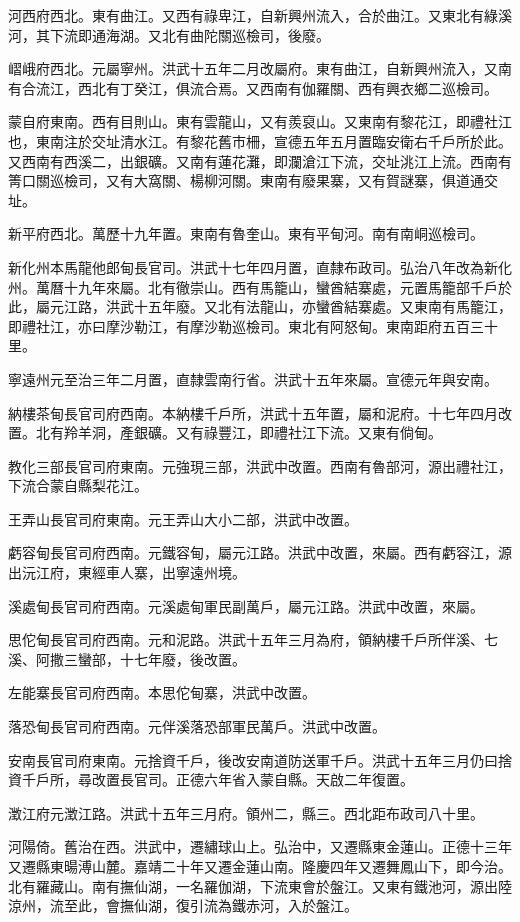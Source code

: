 河西府西北。東有曲江。又西有祿卑江，自新興州流入，合於曲江。又東北有綠溪河，其下流即通海湖。又北有曲陀關巡檢司，後廢。

嶍峨府西北。元屬寧州。洪武十五年二月改屬府。東有曲江，自新興州流入，又南有合流江，西北有丁癸江，俱流合焉。又西南有伽羅關、西有興衣鄉二巡檢司。

蒙自府東南。西有目則山。東有雲龍山，又有羨裒山。又東南有黎花江，即禮社江也，東南注於交址清水江。有黎花舊市柵，宣德五年五月置臨安衛右千戶所於此。又西南有西溪二，出銀礦。又南有蓮花灘，即瀾滄江下流，交址洮江上流。西南有箐口關巡檢司，又有大窩關、楊柳河關。東南有廢果寨，又有賀謎寨，俱道通交址。

新平府西北。萬歷十九年置。東南有魯奎山。東有平甸河。南有南峒巡檢司。

新化州本馬龍他郎甸長官司。洪武十七年四月置，直隸布政司。弘治八年改為新化州。萬曆十九年來屬。北有徹崇山。西有馬籠山，蠻酋結寨處，元置馬籠部千戶於此，屬元江路，洪武十五年廢。又北有法龍山，亦蠻酋結寨處。又東南有馬籠江，即禮社江，亦曰摩沙勒江，有摩沙勒巡檢司。東北有阿怒甸。東南距府五百三十里。

寧遠州元至治三年二月置，直隸雲南行省。洪武十五年來屬。宣德元年與安南。

納樓茶甸長官司府西南。本納樓千戶所，洪武十五年置，屬和泥府。十七年四月改置。北有羚羊洞，產銀礦。又有祿豐江，即禮社江下流。又東有倘甸。

教化三部長官司府東南。元強現三部，洪武中改置。西南有魯部河，源出禮社江，下流合蒙自縣梨花江。

王弄山長官司府東南。元王弄山大小二部，洪武中改置。

虧容甸長官司府西南。元鐵容甸，屬元江路。洪武中改置，來屬。西有虧容江，源出沅江府，東經車人寨，出寧遠州境。

溪處甸長官司府西南。元溪處甸軍民副萬戶，屬元江路。洪武中改置，來屬。

思佗甸長官司府西南。元和泥路。洪武十五年三月為府，領納樓千戶所伴溪、七溪、阿撒三蠻部，十七年廢，後改置。

左能寨長官司府西南。本思佗甸寨，洪武中改置。

落恐甸長官司府西南。元伴溪落恐部軍民萬戶。洪武中改置。

安南長官司府東南。元捨資千戶，後改安南道防送軍千戶。洪武十五年三月仍曰捨資千戶所，尋改置長官司。正德六年省入蒙自縣。天啟二年復置。

澂江府元澂江路。洪武十五年三月府。領州二，縣三。西北距布政司八十里。

河陽倚。舊治在西。洪武中，遷繡球山上。弘治中，又遷縣東金蓮山。正德十三年又遷縣東暘溥山麓。嘉靖二十年又遷金蓮山南。隆慶四年又遷舞鳳山下，即今治。北有羅藏山。南有撫仙湖，一名羅伽湖，下流東會於盤江。又東有鐵池河，源出陸涼州，流至此，會撫仙湖，復引流為鐵赤河，入於盤江。

